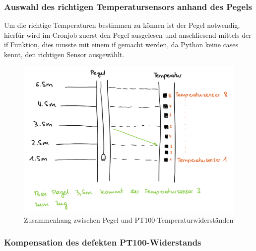 \subsubsection*{Auswahl des richtigen Temperatursensors anhand des Pegels}
\newline
{}\newline
Um die richtige Temperaturen bestimmen zu können ist der Pegel notwendig, hierfür wird im Cronjob zuerst den Pegel ausgelesen und anschliesend mittels der if Funktion, dies musste mit einem if gemacht werden, da Python keine cases kennt, den richtigen Sensor ausgewählt.

\begin{figure}[h]
	\centering
	\includegraphics[width=0.9\linewidth]{img/wassertempsensoren.png}
	\caption{Zusammenhang zwischen Pegel und PT100-Temperaturwiderständen}
	\label{img:wassertempsensoren}
\end{figure}


\subsubsection*{Kompensation des defekten PT100-Widerstands}
\newline
{}\newline
{}\newline








